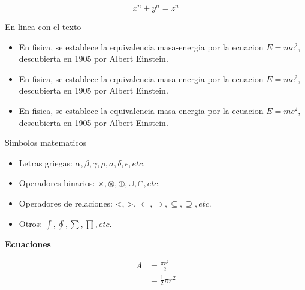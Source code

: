 \documentclass[]{article} %
\begin{document}
        \[ x^n + y^n = z^n\]


        \underline{En linea con el texto}
        \begin{itemize}
            \item En fisica, se establece la equivalencia masa-energia por la ecuacion $E=mc^2$, descubierta en 1905 por Albert Einstein.

            \item En fisica, se establece la equivalencia masa-energia por la ecuacion \(E=mc^2\), descubierta en 1905 por Albert Einstein.

            \item En fisica, se establece la equivalencia masa-energia por la ecuacion \begin{math}E=mc^2\end{math}, descubierta en 1905 por Albert Einstein.
        \end{itemize}

       \underline{Simbolos matematicos}
       \begin{itemize}
        \item Letras griegas: $\alpha, \beta, \gamma, \rho, \sigma, \delta, \epsilon, etc.$

        \item Operadores binarios: $\times, \otimes, \oplus, \cup, \cap, etc.$ 

        \item Operadores de relaciones: <, >, $\subset, \supset, \subseteq, \supseteq, etc.$
        
        \item Otros: $\int, \oint, \sum, \prod, etc.$\\
        \end{itemize}

        \pagebreak
        \textbf{Ecuaciones}

        \begin{equation} \label{eq1}
            \begin{split}
            A & = \frac{\pi r^2}{2} \\
             & = \frac{1}{2} \pi r^2
            \end{split}
        \end{equation}

\end{document}
